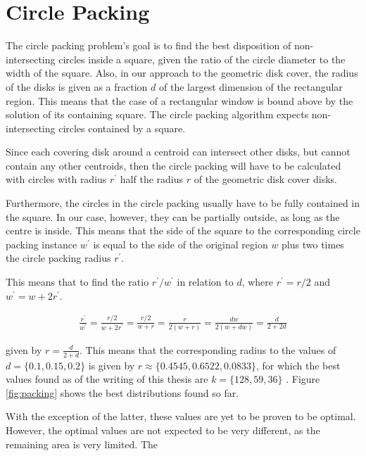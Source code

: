 \section{Circle Packing}
\label{ann:packing}
The circle packing problem's goal is to find the best disposition of non-intersecting circles inside a square, given the ratio of the circle diameter to the width of the square. Also, in our approach to the geometric disk cover, the radius of the disks is given as a fraction $d$ of the largest dimension of the rectangular region. This means that the case of a rectangular window is bound above by the solution of its containing square. The circle packing algorithm expects non-intersecting circles contained by a square. 

Since each covering disk around a centroid can intersect other disks, but cannot contain any other centroids, then the circle packing will have to be calculated with circles with radius $r^\prime$ half the radius $r$ of the geometric disk cover disks.

Furthermore, the circles in the circle packing usually have to be fully contained in the square. In our case, however, they can be partially outside, as long as the centre is inside. This means that the side of the square to the corresponding circle packing instance $w^\prime$ is equal to the side of the original region $w$ plus two times the circle packing radius $r^\prime$.

This means that to find the ratio $r^\prime/w^\prime$ in relation to $d$, where $r^\prime=r/2$ and $w^\prime=w+2r^\prime$.

\begin{align}
	\frac{r^\prime}{w^\prime} = \frac{r/2}{w+2r^\prime} = \frac{r/2}{w+r} = \frac{r}{2(w+r)} = \frac{dw}{2(w+dw)}=\frac{d}{2+2d}
\end{align}

given by $r=\frac{d}{2+d}$. This means that the corresponding radius to the values of $d=\{0.1,0.15,0.2\}$ is given by $r\approx\{0.4545,0.6522,0.0833\}$, for which the best values found as of the writing of this thesis are $k=\{128,59,36\}$ \cite{pack1,pack2,pack3}. Figure \ref{fig:packing} shows the best distributions found so far.




With the exception of the latter, these values are yet to be proven to be optimal. However, the optimal values are not expected to be very different, as the remaining area is very limited. The
